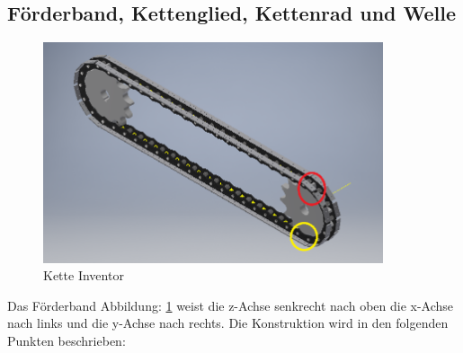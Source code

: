 \subsection{Förderband, Kettenglied, Kettenrad und Welle}

\begin{figure}[H]
\begin{center}
\includegraphics[width=10cm]{Bilder/Inventor/Kette}
\caption{Kette Inventor}
\label{Kette_Inventor} 
\end{center}
\end{figure}


Das Förderband Abbildung: \ref{Kette_Inventor} weist die z-Achse senkrecht nach oben die x-Achse nach links und die y-Achse nach rechts. Die Konstruktion wird in den folgenden Punkten beschrieben:


